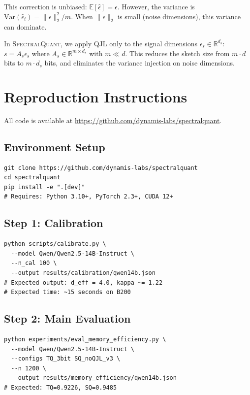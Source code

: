 \documentclass[11pt]{article}
\newcommand{\SQ}{\textsc{SpectralQuant}}
\newcommand{\R}{\mathbb{R}}
\newcommand{\E}{\mathbb{E}}
\newcommand{\Var}{\mathrm{Var}}
\begin{document}
This correction is unbiased: $\E[\hat{\epsilon}] = \epsilon$.  However, the
variance is $\Var(\hat{\epsilon}_i) = \|\epsilon\|_2^2 / m$.  When
$\|\epsilon\|_2$ is small (noise dimensions), this variance can dominate.

In \SQ{}, we apply QJL only to the signal dimensions $\epsilon_s \in \R^{d_s}$:
$s = A_s \epsilon_s$ where $A_s \in \R^{m \times d_s}$ with $m \ll d$.  This
reduces the sketch size from $m \cdot d$ bits to $m \cdot d_s$ bits, and
eliminates the variance injection on noise dimensions.

\section{Reproduction Instructions}
\label{app:reproduction}

All code is available at \url{https://github.com/dynamis-labs/spectralquant}.

\subsection*{Environment Setup}

\begin{verbatim}
git clone https://github.com/dynamis-labs/spectralquant
cd spectralquant
pip install -e ".[dev]"
# Requires: Python 3.10+, PyTorch 2.3+, CUDA 12+
\end{verbatim}

\subsection*{Step 1: Calibration}

\begin{verbatim}
python scripts/calibrate.py \
  --model Qwen/Qwen2.5-14B-Instruct \
  --n_cal 100 \
  --output results/calibration/qwen14b.json
# Expected output: d_eff = 4.0, kappa ~= 1.22
# Expected time: ~15 seconds on B200
\end{verbatim}

\subsection*{Step 2: Main Evaluation}

\begin{verbatim}
python experiments/eval_memory_efficiency.py \
  --model Qwen/Qwen2.5-14B-Instruct \
  --configs TQ_3bit SQ_noQJL_v3 \
  --n 1200 \
  --output results/memory_efficiency/qwen14b.json
# Expected: TQ=0.9226, SQ=0.9485
\end{verbatim}
\end{document}
